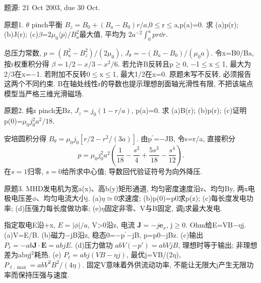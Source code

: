 题源: 21 Oct 2003, due 30 Oct.
\begin{exercise}\label{ex:03-6-1}
原题1. \ensuremath{\theta} pinch平衡 $B_z=B_0+(B_a-B_0)r/a$,0\ensuremath{\le}r\ensuremath{\le}a,p(a)=0. 求 (a)p(r); (b)J(r); (c)\ensuremath{\beta}=$2\mu_0\langle p\rangle/B_a^2$最大值, 平均为 $2a^{-2}\int_0^ap r\dd r$.
\end{exercise}
\begin{solution}
总压力常数, $p=(B_a^2-B_z^2)/(2\mu_0)$, $J_\theta=-(B_a-B_0)/(\mu_0a)$. 令x=B0/Ba, 按r权重积分得 $\beta=1/2-x/3-x^2/6$. 若允许B反转且p\ensuremath{\ge}0, \ensuremath{-}1\ensuremath{\le}x\ensuremath{\le}1, 最大为2/3在x=\ensuremath{-}1. 若附加不反转0\ensuremath{\le}x\ensuremath{\le}1, 最大1/2在x=0. 原题未写不反转, 必须报告这两个不同约束. B在轴处线性r的导数也提示理想剖面轴光滑性有限, 不把该端点模型当严格三维光滑磁场.
\end{solution}
\begin{exercise}\label{ex:03-6-2}
原题2. 纯z pinch无Bz, $J_z=j_0(1-r/a)$, p(a)=0. 求 (a)B(r); (b)p(r); (c)证明p(0)=$\mu_0j_0^2a^2/18$.
\end{exercise}
\begin{solution}
安培圆积分得 $B_\theta=\mu_0j_0[r/2-r^2/(3a)]$. 由p\ensuremath{{}^{\prime}}=\ensuremath{-}JB, 令s=r/a, 直接积分
\begin{equation}
 p=\mu_0j_0^2a^2\left(\frac1{18}-\frac{s^2}4+\frac{5s^3}{18}-\frac{s^4}{12}\right).
\end{equation}
在$s=1$归零, $s=0$给所求中心值; 导数回代验证符号为向外降压.
\end{solution}
\begin{exercise}\label{ex:03-6-3}
原题3. MHD发电机为宽a(x)、高b(y)矩形通道, 均匀密度速度沿z、均匀By, 两x电极电压差\ensuremath{\phi}、均匀电流大小j. (a)\ensuremath{\eta}\ensuremath{\simeq}0求速度; (b)p(0)=p0求p(z); (c)每长度发电功率; (d)压强力每长度做功率; (e)\ensuremath{\eta}固定非零、V与B固定, 调j求最大发电.
\end{exercise}
\begin{solution}
指定取电E沿+x, $E=|\phi|/a$, V>0沿z, 电流 $\mathbf J=-j\mathbf e_x$, j\ensuremath{\ge}0. Ohm给E=VB\ensuremath{-}\ensuremath{\eta}j. (a)V=E/B. (b)磁力\ensuremath{-}jB沿z, 稳态0=\ensuremath{-}p\ensuremath{{}^{\prime}}\ensuremath{-}jB, p=p0\ensuremath{-}jBz. (c)输出 $P_\ell=-ab\mathbf J\cdot\mathbf E=abjE$. (d)压力做功 $abV(-p')=abVjB$, 理想时等于输出; 非理想差为ab\ensuremath{\eta}j\ensuremath{{}^{2}}耗热. (e) $P_\ell=abj(VB-\eta j)$, 最优j=VB/(2\ensuremath{\eta}), $P_{\ell,\max}=abV^2B^2/(4\eta)$. 固定V意味着外供流动功率, 不能让无限大j产生无限功率而保持压强与速度.
\end{solution}
